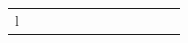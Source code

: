 \documentclass[conference]{IEEEtran}
\begin{document}
\begin{figure}
\begin{center}
\begin{tabular}{| x{1.11cm} | x{.75cm} | x{.75cm} || x{1.11cm} | x{.75cm} | x{.75cm} || x{1.11cm} | x{.75cm} | x{.75cm} || x{1.11cm} | x{.75cm} | x{.75cm} |}
l
\end{tabular}
\end{center}
\end{figure}
\end{document}

